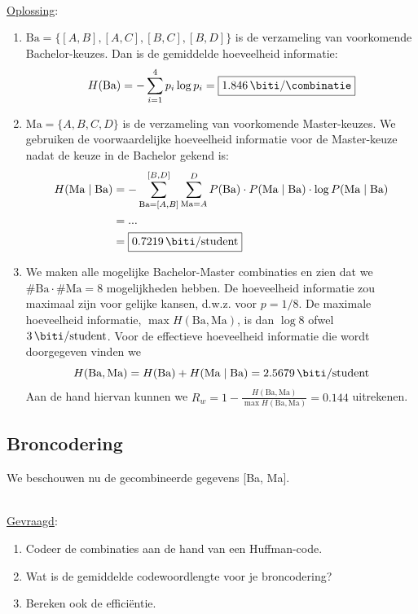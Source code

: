 \documentclass{kuburgiearticle}
\begin{document}
	\hfill \\
	\underline{Oplossing}:
	\begin{enumerate}
		\item \( \text{Ba}=\{ [A,B], [A,C], [B,C], [B,D] \} \) is de verzameling van voorkomende Bachelor-keuzes. Dan is de gemiddelde hoeveelheid informatie: \[ H(\text{Ba})= - \sum_{i=1}^{4} p_i \log{p_i} = \boxed{\SI{1.846}{\biti \per \combinatie}} \]

		\item \( \text{Ma}=\{ A,B,C,D \} \) is de verzameling van voorkomende Master-keuzes.
		We gebruiken de voorwaardelijke hoeveelheid informatie voor de Master-keuze nadat de keuze in de Bachelor gekend is: \begin{align*}
			H(\text{Ma}\mid \text{Ba}) &= -\sum_{\text{Ba}=[A,B]}^{[B,D]}\sum_{\text{Ma}=A}^{D} P(\text{Ba})\cdot P(\text{Ma}\mid \text{Ba})\cdot \log{P(\text{Ma}\mid \text{Ba})} \\
			&= ... \\
			&= \boxed{\SI{0.7219}{\biti \per student}}
		\end{align*}

		\item We maken alle mogelijke Bachelor-Master combinaties en zien dat we \(\#\text{Ba} \cdot \#\text{Ma} = 8\) mogelijkheden hebben. De hoeveelheid informatie zou maximaal zijn voor gelijke kansen, d.w.z. voor \(p=1/8\). De maximale hoeveelheid informatie, \(\max H(\text{Ba}, \text{Ma})\), is dan \(\log{8}\) ofwel \(\SI{3}{\biti \per student}\). Voor de effectieve hoeveelheid informatie die wordt doorgegeven vinden we \[H(\text{Ba}, \text{Ma}) = H(\text{Ba}) + H(\text{Ma} \mid \text{Ba}) = \SI{2.5679}{\biti \per student} \] Aan de hand hiervan kunnen we \(R_w = 1 - \frac{H(\text{Ba}, \text{Ma})}{\max H(\text{Ba}, \text{Ma})} = \boxed{0.144}\) uitrekenen.
	\end{enumerate}

	\subsection{Broncodering}

	We beschouwen nu de gecombineerde gegevens [Ba, Ma].

	\hfill \\
	\underline{Gevraagd}:
	\begin{enumerate}
		\item Codeer de combinaties aan de hand van een Huffman-code.
		\item Wat is de gemiddelde codewoordlengte voor je broncodering?
		\item Bereken ook de efficiëntie.
	\end{enumerate}
\end{document}
